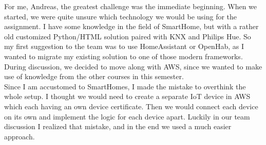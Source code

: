 For me, Andreas, the greatest challenge was the immediate beginning.
When we started, we were quite unsure which technology we would be using for the assignment.
I have some knowledge in the field of SmartHome, but with a rather old customized Python/HTML solution paired with KNX and Philips Hue.
So my first suggestion to the team was to use HomeAssistant or OpenHab, as I wanted to migrate my existing solution to one of those modern frameworks.
During discussion, we decided to move along with AWS, since we wanted to make use of knowledge from the other courses in this semester.\\

Since I am accustomed to SmartHomes, I made the mistake to overthink the whole setup.
I thought we would need to create a separate IoT device in AWS which each having an own device certificate.
Then we would connect each device on its own and implement the logic for each device apart.
Luckily in our team discussion I realized that mistake, and in the end we used a much easier approach.
